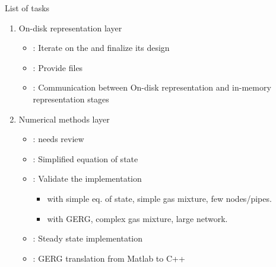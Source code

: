 \begin{frame}{List of tasks}
    \begin{enumerate}
        \item On-disk representation layer
            \begin{itemize}
                \item {}: Iterate on the  and finalize its design 
                \item {}: Provide  files
                \item {}: Communication between On-disk representation and in-memory representation stages             \end{itemize}       
        \item Numerical methods layer
            \begin{itemize}                
                \item {}:  needs review
                 \item {}: Simplified equation of state
                \item {}: Validate the implementation
                \begin{itemize}
                    \item \normalsize {} with simple eq. of state, simple gas mixture, few nodes/pipes. 
                    \item  {} with GERG, complex gas mixture, large network.
                \end{itemize}
                \item {}: Steady state implementation
                \item {}: GERG translation from Matlab to C++ 
            \end{itemize}
    \end{enumerate}
\end{frame}
